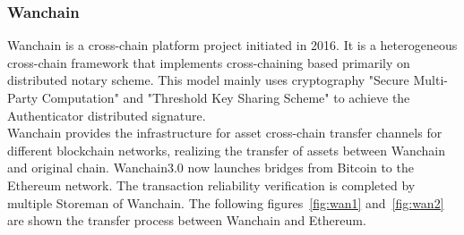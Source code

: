 \subsubsection{Wanchain}
\noindent Wanchain\cite{wanchain.org} is a cross-chain platform project initiated in 2016. It is a heterogeneous cross-chain framework that implements cross-chaining based primarily on distributed notary scheme. This model mainly uses cryptography "Secure Multi-Party Computation" and "Threshold Key Sharing Scheme" to achieve the Authenticator distributed signature.\\

\noindent Wanchain provides the infrastructure for asset cross-chain transfer channels for different blockchain networks, realizing the transfer of assets between Wanchain and original chain. Wanchain3.0 now launches bridges from Bitcoin to the Ethereum network. The transaction reliability verification is completed by multiple Storeman of Wanchain. The following figures~\ref{fig:wan1} and~\ref{fig:wan2} are shown the transfer process between Wanchain and Ethereum.

%        
%        

